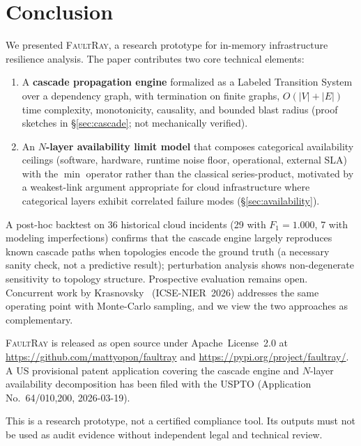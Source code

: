 \documentclass[10pt,twocolumn]{article}
\begin{document}
\section{Conclusion}\label{sec:conclusion}

We presented \textsc{FaultRay}, a research prototype for in-memory
infrastructure resilience analysis. The paper contributes two core
technical elements:

\begin{enumerate}[nosep]
\item A \textbf{cascade propagation engine} formalized as a Labeled
  Transition System over a dependency graph, with termination
  on finite graphs, $O(|V| + |E|)$ time complexity, monotonicity,
  causality, and bounded blast radius (proof sketches in
  \S\ref{sec:cascade}; not mechanically verified).
\item An \textbf{$N$-layer availability limit model} that composes
  categorical availability ceilings (software, hardware, runtime
  noise floor, operational, external SLA) with the $\min$ operator rather than
  the classical series-product, motivated by a weakest-link argument
  appropriate for cloud infrastructure where categorical layers
  exhibit correlated failure modes (\S\ref{sec:availability}).
\end{enumerate}

A post-hoc backtest on 36 historical cloud incidents (29 with
$F_1 = 1.000$, 7 with modeling imperfections) confirms that the
cascade engine largely reproduces known cascade paths when
topologies encode the ground truth (a necessary sanity check,
not a predictive result); perturbation analysis shows
non-degenerate sensitivity to topology structure. Prospective
evaluation remains open. Concurrent work by Krasnovsky~\cite{krasnovsky2026}
(ICSE-NIER~2026) addresses the same operating point with Monte-Carlo
sampling, and we view the two approaches as complementary.

\textsc{FaultRay} is released as open source under Apache~License~2.0
at \url{https://github.com/mattyopon/faultray} and
\url{https://pypi.org/project/faultray/}.
A US provisional patent application covering the cascade engine and
$N$-layer availability decomposition has been filed with the USPTO
(Application No.~64/010,200, 2026-03-19).

This is a research prototype, not a certified compliance tool. Its
outputs must not be used as audit evidence without independent legal
and technical review.
\end{document}
